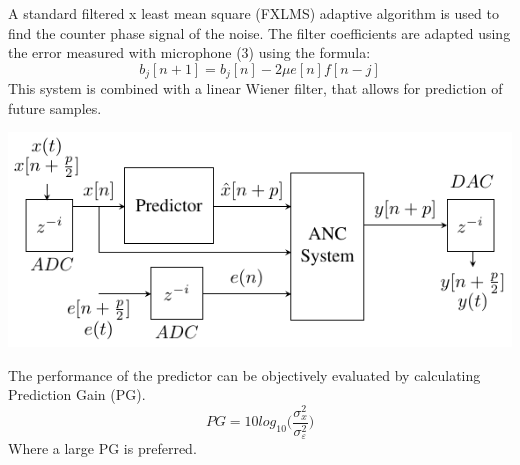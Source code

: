 A standard filtered x least mean square (FXLMS) adaptive algorithm is used to find the counter phase signal of the noise. The filter coefficients are adapted using the error measured with microphone (3) using the formula:
\begin{equation*}
	b_j[n+1] = b_j[n] - 2\mu e[n]f[n-j]
\end{equation*}	 
This system is combined with a linear Wiener filter, that allows for prediction of future samples.    
\begin{centering}
	\includegraphics[width=\textwidth]{figures/CombinedSystem2.pdf}
\end{centering}
The performance of the predictor can be objectively evaluated by calculating Prediction Gain (PG).
\begin{equation*}
	PG = 10 log_{10}\bigg(\frac{\sigma^2_x}{\sigma^2_\varepsilon}\bigg)
\end{equation*}
Where a large PG is preferred. 

